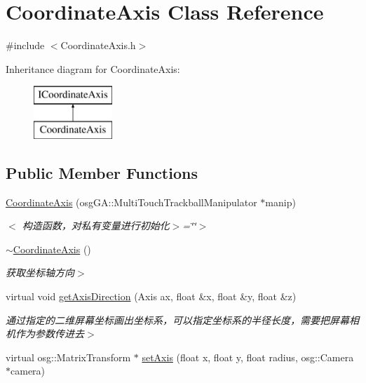 \hypertarget{class_coordinate_axis}{}\section{Coordinate\+Axis Class Reference}
\label{class_coordinate_axis}


{\ttfamily \#include $<$Coordinate\+Axis.\+h$>$}

Inheritance diagram for Coordinate\+Axis\+:\begin{figure}[H]
\begin{center}
\leavevmode
\includegraphics[height=2.000000cm]{class_coordinate_axis}
\end{center}
\end{figure}
\subsection*{Public Member Functions}
\begin{DoxyCompactItemize}
\item 
\hyperlink{class_coordinate_axis_a3dca3ab6abacbba77f64ef13e6184707}{Coordinate\+Axis} (osg\+G\+A\+::\+Multi\+Touch\+Trackball\+Manipulator $\ast$manip)
\begin{DoxyCompactList}\small\item\em $<$ 构造函数，对私有变量进行初始化$>$=\char`\"{}\char`\"{}$>$ \end{DoxyCompactList}\item 
\hyperlink{class_coordinate_axis_aeaf2a1f97ff54633e877b4b974839635}{$\sim$\+Coordinate\+Axis} ()\hypertarget{class_coordinate_axis_aeaf2a1f97ff54633e877b4b974839635}{}\label{class_coordinate_axis_aeaf2a1f97ff54633e877b4b974839635}

\begin{DoxyCompactList}\small\item\em 获取坐标轴方向$>$ \end{DoxyCompactList}\item 
virtual void \hyperlink{class_coordinate_axis_a97f2838c4ade40588c8e680f4ff51629}{get\+Axis\+Direction} (Axis ax, float \&x, float \&y, float \&z)
\begin{DoxyCompactList}\small\item\em 通过指定的二维屏幕坐标画出坐标系，可以指定坐标系的半径长度，需要把屏幕相机作为参数传进去$>$ \end{DoxyCompactList}\item 
virtual osg\+::\+Matrix\+Transform $\ast$ \hyperlink{class_coordinate_axis_acbd3e387e7cf1dd0d8ae83ed4073b5c2}{set\+Axis} (float x, float y, float radius, osg\+::\+Camera $\ast$camera)
\end{DoxyCompactItemize}



